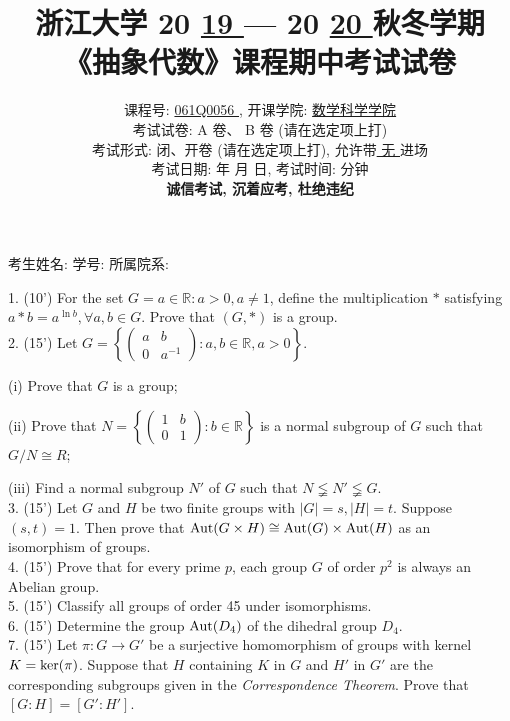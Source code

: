 \documentclass[UTF8]{ctexart}
\title{
\textbf{浙江大学 }20 \underline{ 19 } — 20 \underline{ 20 } \textbf{秋冬学期} \\
\textbf{《抽象代数》课程期中考试试卷}
}
\author{
课程号: \underline{ \quad 061Q0056 \quad }, 开课学院: \underline{ \quad 数学科学学院 \quad } \\
考试试卷: \checkmark A 卷、 B 卷 (请在选定项上打\checkmark) \\
考试形式: \checkmark 闭、开卷 (请在选定项上打\checkmark), 允许带\underline{ \quad 无 \quad  }进场 \\
考试日期: \underline{ \quad 2019 \quad } 年 \underline{ \quad 11 \quad } 月 \underline{ \quad 09 \quad } 日, 考试时间: \underline{ \quad 120 \quad }分钟 \\
\textbf{诚信考试, 沉着应考, 杜绝违纪}
}
\date{}
\begin{document}
\maketitle

\begin{center}
考生姓名: \underline{\quad\quad\quad\quad\quad\quad\quad\quad\quad}  学号: \underline{\quad\quad\quad\quad\quad\quad\quad\quad\quad}  所属院系: \underline{\quad\quad\quad\quad\quad\quad\quad\quad\quad}
\end{center}

1. (10') For the set $G={a\in\mathbb{R}:a>0,a\neq1}$, define the multiplication $*$ satisfying $a*b=a^{\ln b},\forall a,b\in G$. Prove that $(G,*)$ is a group.
\\

2. (15') Let $G=\left\{
                \left(\begin{matrix}
                            a & b \\
                            0 & a^{-1}
                            \end{matrix}\right):a,b\in\mathbb{R},a>0
                \right\}$.

(i)  Prove that $G$ is a group;

(ii) Prove that $N=\left\{
                    \left(\begin{matrix}
                        1 & b \\
                        0 & 1
                        \end{matrix}\right):b\in\mathbb{R}
                    \right\}$ is a normal subgroup of $G$ such that $G/N\cong R$;

(iii) Find a normal subgroup $N'$ of $G$ such that $N \lneqq N' \lneqq G$.
\\

3. (15') Let $G$ and $H$ be two finite groups with $|G|=s, |H|=t$. Suppose $(s,t)=1$. Then prove that ${\rm Aut}(G\times H) \cong {\rm Aut}(G)\times{\rm Aut}(H)$ as an isomorphism of groups.
\\

4. (15') Prove that for every prime $p$, each group $G$ of order $p^2$ is always an Abelian group.
\\

5. (15') Classify all groups of order 45 under isomorphisms.
\\

6. (15') Determine the group ${\rm Aut}(D_4)$ of the dihedral group $D_4$.
\\

7. (15') Let $\pi : G \rightarrow G'$ be a surjective homomorphism of groups with kernel $K={\rm ker} (\pi)$. Suppose that $H$ containing $K$ in $G$ and $H'$ in $G'$ are the corresponding subgroups given in the \textit{Correspondence Theorem}. Prove that $[G:H]=[G':H']$.
\end{document}
